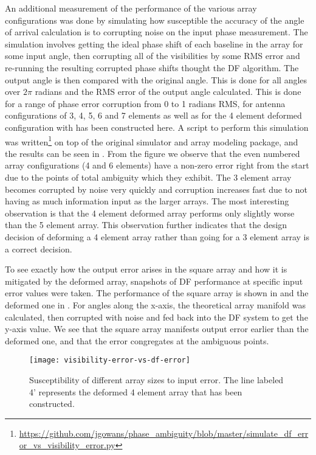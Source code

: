 An additional measurement of the performance of the various array configurations was done by simulating how susceptible the accuracy of the angle of arrival calculation is to corrupting noise on the input phase measurement. The simulation involves getting the ideal phase shift of each baseline in the array for some input angle, then corrupting all of the visibilities by some RMS error and re-running the resulting corrupted phase shifts thought the DF algorithm. The output angle is then compared with the original angle. This is done for all angles over \(2\pi\) radians and the RMS error of the output angle calculated. This is done for a range of phase error corruption from 0 to 1 radians RMS, for antenna configurations of 3, 4, 5, 6 and 7 elements as well as for the 4 element deformed configuration with has been constructed here. A script to perform this simulation was written\footnote{\url{https://github.com/jgowans/phase_ambiguity/blob/master/simulate_df_error_vs_visibility_error.py}} on top of the original simulator and array modeling package, and the results can be seen in . From the figure we observe that the even numbered array configurations (4 and 6 elements) have a non-zero error right from the start due to the points of total ambiguity which they exhibit. The 3 element array becomes corrupted by noise very quickly and corruption increases fast due to not having as much information input as the larger arrays. The most interesting observation is that the 4 element deformed array performs only slightly worse than the 5 element array. This observation further indicates that the design decision of deforming a 4 element array rather than going for a 3 element array is a correct decision.

To see exactly how the output error arises in the square array and how it is mitigated by the deformed array, snapshots of DF performance at specific input error values were taken. The performance of the square array is shown in  and the deformed one in . For angles along the x-axis, the theoretical array manifold was calculated, then corrupted with noise and fed back into the DF system to get the y-axis value. We see that the square array manifests output error earlier than the deformed one, and that the error congregates at the ambiguous points.

\begin{figure}
  \centering
  \texttt{[image: visibility-error-vs-df-error]}
  \caption{Susceptibility of different array sizes to input error. The line labeled 4' represents the deformed 4 element array that has been constructed.}
  \label{fig:antenna-array:configuration-vs-input-error-vs-output-error}
\end{figure}

